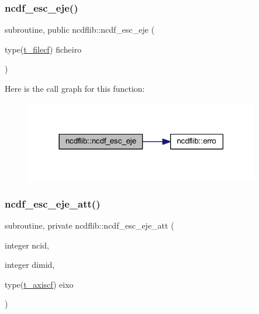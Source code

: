 \subsubsection{\texorpdfstring{ncdf\+\_\+esc\+\_\+eje()}{ncdf\_esc\_eje()}}
{\footnotesize\ttfamily subroutine, public ncdflib\+::ncdf\+\_\+esc\+\_\+eje (\begin{DoxyParamCaption}\item[{type(\mbox{\hyperlink{structncdflib_1_1t__filecf}{t\+\_\+filecf}})}]{ficheiro }\end{DoxyParamCaption})}

Here is the call graph for this function\+:\nopagebreak
\begin{figure}[H]
\begin{center}
\leavevmode
\includegraphics[width=290pt]{namespacencdflib_a15543143f5feb2ff655f4b60aeae5354_cgraph}
\end{center}
\end{figure}
\mbox{\label{namespacencdflib_a9357ce05485fdb83f341289a30c10ce1}} 
\subsubsection{\texorpdfstring{ncdf\+\_\+esc\+\_\+eje\+\_\+att()}{ncdf\_esc\_eje\_att()}}
{\footnotesize\ttfamily subroutine, private ncdflib\+::ncdf\+\_\+esc\+\_\+eje\+\_\+att (\begin{DoxyParamCaption}\item[{integer}]{ncid,  }\item[{integer}]{dimid,  }\item[{type(\mbox{\hyperlink{structncdflib_1_1t__axiscf}{t\+\_\+axiscf}})}]{eixo }\end{DoxyParamCaption})\hspace{0.3cm}{\ttfamily [private]}}

